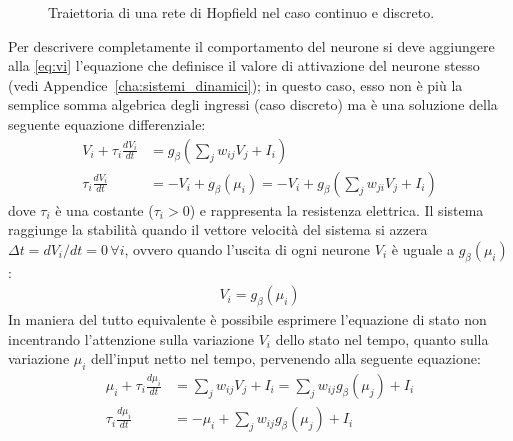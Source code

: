 		\begin{figure}[h!]
			\centering
			\quad
			\caption[Confronto tra caso continuo e discreto]{Traiettoria di una rete di Hopfield nel caso continuo e discreto.}
		\end{figure}
		Per descrivere completamente il comportamento del neurone si deve aggiungere alla \eqref{eq:vi} l'equazione che definisce il valore di attivazione del neurone stesso (vedi Appendice~\ref{cha:sistemi_dinamici}); in questo caso, esso non è più la semplice somma algebrica degli ingressi (caso discreto) ma è una soluzione della seguente equazione differenziale:
		\begin{align*}
			V_i + \tau_i \frac{d V_i}{dt} &= g_\beta \left(\sum_{j} w_{ij} V_j + I_i \right) \\
			\tau_i \frac{d V_i}{dt} &= - V_i + g_\beta(\mu_i) = - V_i + g_\beta \left(\sum_j w_{ji} V_j + I_i \right)
		\end{align*}
		dove $\tau_i$ è una costante ($\tau_i > 0$) e rappresenta la resistenza elettrica. Il sistema raggiunge la stabilità quando il vettore velocità del sistema si azzera $\Delta t = dV_i / dt= 0 \, \forall i$, ovvero quando l'uscita di ogni neurone $V_i$ è uguale a $g_\beta(\mu_i)$:
		\begin{align*}
			V_i = g_\beta(\mu_i)
		\end{align*}
		In maniera del tutto equivalente è possibile esprimere l’equazione di stato non incentrando l’attenzione sulla variazione $V_i$ dello stato nel tempo, quanto sulla variazione $\mu_i$ dell’input netto nel tempo, pervenendo alla seguente equazione:
		\begin{align}
			\mu_i + \tau_i \frac{d\mu_i}{dt} &= \sum_j w_{ij} V_j + I_i = \sum_j w_{ij} g_\beta (\mu_j) + I_i \\
			\tau_i \frac{d\mu_i}{dt} &= -\mu_i + \sum_j w_{ij} g_\beta (\mu_j) + I_i \label{eq:mu}
		\end{align}

